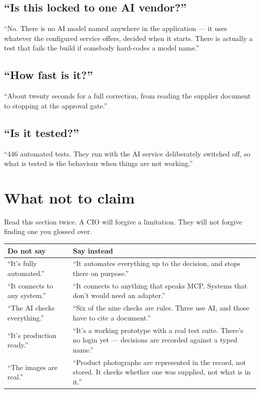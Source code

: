 \documentclass[11pt,a4paper]{article}
\begin{document}
\subsection{``Is this locked to one AI vendor?''}

\begin{say}
``No. There is no AI model named anywhere in the application --- it uses
whatever the configured service offers, decided when it starts. There is
actually a test that fails the build if somebody hard-codes a model name.''
\end{say}

\subsection{``How fast is it?''}

\begin{say}
``About twenty seconds for a full correction, from reading the supplier
document to stopping at the approval gate.''
\end{say}

\subsection{``Is it tested?''}

\begin{say}
``446 automated tests. They run with the AI service deliberately switched off,
so what is tested is the behaviour when things are not working.''
\end{say}

\section{What not to claim}

Read this section twice. A CIO will forgive a limitation. They will not forgive
finding one you glossed over.

\begin{longtable}{@{}p{6.4cm}p{8.6cm}@{}}
\toprule
\textbf{Do not say} & \textbf{Say instead} \\
\midrule
\endhead
``It's fully automated.'' & ``It automates everything up to the decision, and
stops there on purpose.'' \\[4pt]
``It connects to any system.'' & ``It connects to anything that speaks MCP.
Systems that don't would need an adapter.'' \\[4pt]
``The AI checks everything.'' & ``Six of the nine checks are rules. Three use
AI, and those have to cite a document.'' \\[4pt]
``It's production ready.'' & ``It's a working prototype with a real test suite.
There's no login yet --- decisions are recorded against a typed name.'' \\[4pt]
``The images are real.'' & ``Product photographs are represented in the record,
not stored. It checks whether one was supplied, not what is in it.'' \\
\bottomrule
\end{longtable}
\end{document}
